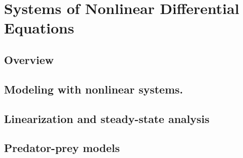 \documentclass{article}
\begin{document}
\pagebreak

\section{Systems of Nonlinear Differential Equations}

\subsection*{Overview}

\subsection{Modeling with nonlinear systems.}
\subsection{Linearization and steady-state analysis}
\subsection{Predator-prey models}


\pagebreak
\end{document}
